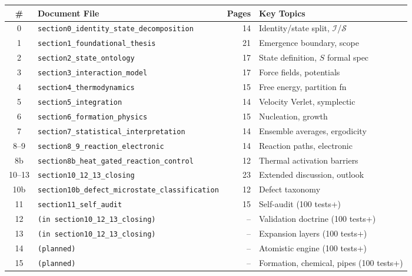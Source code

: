 \documentclass[11pt, letterpaper]{article}
\begin{document}
\begin{center}
\renewcommand{\arraystretch}{1.2}
\begin{tabular}{clrl}
\toprule
\textbf{\#} & \textbf{Document File} & \textbf{Pages} & \textbf{Key Topics} \\
\midrule
0  & \texttt{section0\_identity\_state\_decomposition}  & 14 & Identity/state split, $\mathcal{I}$/$\mathcal{S}$ \\
1  & \texttt{section1\_foundational\_thesis}            & 21 & Emergence boundary, scope \\
2  & \texttt{section2\_state\_ontology}                 & 17 & State definition, $S$ formal spec \\
3  & \texttt{section3\_interaction\_model}              & 17 & Force fields, potentials \\
4  & \texttt{section4\_thermodynamics}                  & 15 & Free energy, partition fn \\
5  & \texttt{section5\_integration}                     & 14 & Velocity Verlet, symplectic \\
6  & \texttt{section6\_formation\_physics}              & 15 & Nucleation, growth \\
7  & \texttt{section7\_statistical\_interpretation}     & 14 & Ensemble averages, ergodicity \\
8--9 & \texttt{section8\_9\_reaction\_electronic}       & 14 & Reaction paths, electronic \\
8b & \texttt{section8b\_heat\_gated\_reaction\_control} & 12 & Thermal activation barriers \\
10--13 & \texttt{section10\_12\_13\_closing}            & 23 & Extended discussion, outlook \\
10b & \texttt{section10b\_defect\_microstate\_classification} & 12 & Defect taxonomy \\
11 & \texttt{section11\_self\_audit}                    & 15 & Self-audit (100 tests+) \\
12 & \texttt{(in section10\_12\_13\_closing)}           & -- & Validation doctrine (100 tests+) \\
13 & \texttt{(in section10\_12\_13\_closing)}           & -- & Expansion layers (100 tests+) \\
14 & \texttt{(planned)}                                & -- & Atomistic engine (100 tests+) \\
15 & \texttt{(planned)}                                & -- & Formation, chemical, pipes (100 tests+) \\
\bottomrule
\end{tabular}
\end{center}
\end{document}
